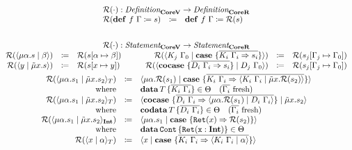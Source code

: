 \begin{gather*}
  \begin{array}{rcl}
    \multicolumn{3}{c}{\redundancy{\cdot} : \emph{Definition}_{\targetvar{}} \rightarrow \emph{Definition}_{\targetred{}}}\\
    \redundancy{\defi{f\ \Gamma}{s}} & \coloneq & \defi{f\ \Gamma}{\redundancy{s}} \\
  \end{array}
  \\\\
  \begin{array}{rclrcl}
    \multicolumn{6}{c}{\redundancy{\cdot} : \emph{Statement}_{\targetvar{}} \rightarrow \emph{Statement}_{\targetred{}}}\\
    \redundancy{\cut{\mu\alpha.s}{\beta}} & \coloneq & \redundancy{s[\alpha \mapsto \beta]} &
    \redundancy{\cut{K_j\ \Gamma_0}{\case{\overline{K_i\ \Gamma_i \Rightarrow s_i}}}} & \coloneq & \redundancy{s_j[\Gamma_j \mapsto \Gamma_0]} \\
    \redundancy{\cut{y}{\tilde{\mu}x.s}} & \coloneq & \redundancy{s[x \mapsto y]} & \qquad
    \redundancy{\cut{\cocase{\overline{D_i\ \Gamma_i \Rightarrow s_i}}}{D_j\ \Gamma_0}} & \coloneq & \redundancy{s_j[\Gamma_j \mapsto \Gamma_0]} \\
  \end{array}
  \\
  \begin{array}{rcl}
    \redundancy{\cut{\mu\alpha.s_1}{\tilde{\mu}x.s_2}_T} & \coloneq & \cut{\mu\alpha.\redundancy{s_1}}{\case{\overline{K_i\ \Gamma_i \Rightarrow \cut{K_i\ \Gamma_i}{\tilde{\mu}x.\redundancy{s_2}}}}} \\
    \text{where} &  & \data{T}{\overline{K_i\ \Gamma_i}} \in \Theta \quad \fresh{\overline{\Gamma_i}} \\
    \redundancy{\cut{\mu\alpha.s_1}{\tilde{\mu}x.s_2}_T} & \coloneq & \cut{\cocase{\overline{D_i\ \Gamma_i \Rightarrow \cut{\mu\alpha.\redundancy{s_1}}{D_i\ \Gamma_i}}}}{\tilde{\mu}x.s_2} \\
    \text{where} &  & \codata{T}{\overline{D_i\ \Gamma_i}} \in \Theta \quad \fresh{\overline{\Gamma_i}} \\
    \redundancy{\cut{\mu\alpha.s_1}{\tilde{\mu}x.s_2}_\tyint} & \coloneq & \cut{\mu\alpha.s_1}{\case{\mathtt{Ret}(x) \Rightarrow \redundancy{s_2}}} \\
    \text{where} & & \data{\mathtt{Cont}}{\mathtt{Ret(x : \tyint)}} \in \Theta \\
    \redundancy{\cut{x}{\alpha}_T} & \coloneq & \cut{x}{\case{\overline{K_i\ \Gamma_i \Rightarrow \cut{K_i\ \Gamma_i}{\alpha}}}} \\

\end{array}
\end{gather*}
